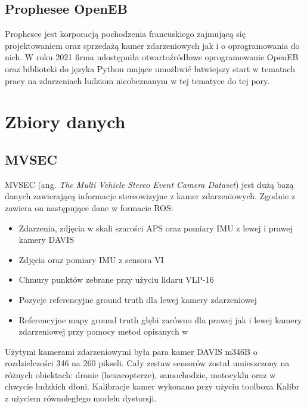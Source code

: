     
    \subsection{Prophesee OpenEB}
    \label{subsec:openEB}
    Prophesee jest korporacją pochodzenia francuskiego zajmującą się projektowaniem oraz sprzedażą kamer zdarzeniowych jak i o oprogramowania do nich. W roku 2021 firma udostępniła otwartoźródłowe oprogramowanie OpenEB oraz biblioteki do języka Python mające umożliwić łatwiejszy start w tematach pracy na zdarzeniach ludziom nieobeznanym w tej tematyce do tej pory. {\color{red}{Więcej chwilowo trudno napisać bo Essentials nie działa, nikt nie wie dlaczego a Prophesee nie odpowiedziało mi na maila.}}

\section{Zbiory danych}
\label{sec:ZbioryDanych}

    \subsection{MVSEC}
    \label{subsec:mvsec}
    MVSEC (ang. \emph{The Multi Vehicle Stereo Event Camera Dataset}) jest dużą bazą danych zawierającą informacje stereowizyjne z kamer zdarzeniowych. Zgodnie z \cite{MVSEC} zawiera on następujące dane w formacie ROS:
    
    \begin{itemize}
        \item Zdarzenia, zdjęcia w skali szarości APS oraz pomiary IMU z lewej i prawej kamery DAVIS
        
        \item Zdjęcia oraz pomiary IMU z sensora VI
        
        \item Chmury punktów zebrane przy użyciu lidaru VLP-16
        
        \item Pozycje referencyjne ground truth dla lewej kamery zdarzeniowej
        
        \item Referencyjne mapy ground truth głębi zarówno dla prawej jak i lewej kamery zdarzeniowej przy pomocy metod opisanych w \cite{DBLP:journals/corr/abs-1802-06898}
    \end{itemize}
    
    Użytymi kamerami zdarzeniowymi była para kamer DAVIS m346B o rozdzielczości 346 na 260 pikseli. Cały zestaw sensorów został umieszczony na różnych obiektach: dronie (hexacopterze), samochodzie, motocyklu oraz w chwycie ludzkich dłoni. Kalibracje kamer wykonano przy użyciu toolboxa Kalibr z użyciem równoległego modelu dystorsji. 
    
